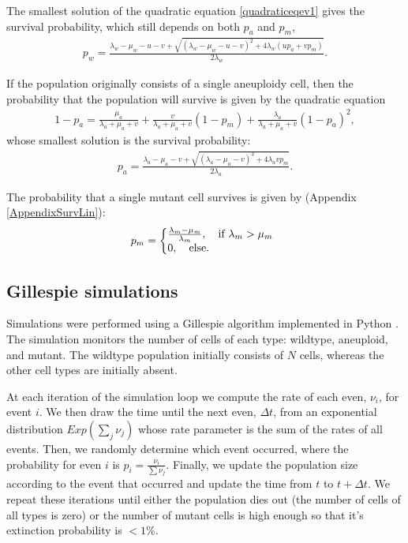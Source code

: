 \documentclass[12pt]{extarticle}
\begin{document}
The smallest solution of the quadratic equation \cref{quadraticeqev1} gives the survival probability, which still depends on both $p_a$ and $p_m$,
\begin{align}\label{survprobw}
p_w=\frac{\lambda_w-\mu_w-u-v+\sqrt{\left(\lambda_w-\mu_w-u-v\right)^2+4\lambda_w\left(up_a+vp_m\right)}}{2\lambda_w} .
\end{align}

If the population originally consists of a single aneuploidy cell, then the probability that the population will survive is given by the quadratic equation
\begin{align}
1-p_a=\frac{\mu_a}{\lambda_a+\mu_a+v}+\frac{v}{\lambda_a+\mu_a+v}\left(1-p_m\right)+\frac{\lambda_a}{\lambda_a+\mu_a+v}\left(1-p_a\right)^2,
\end{align}
whose smallest solution is the survival probability:
\begin{align}\label{survproba}
p_a=\frac{\lambda_a-\mu_a-v+\sqrt{\left(\lambda_a-\mu_a-v\right)^2+4\lambda_avp_m}}{2\lambda_a}.
\end{align}

The probability that a single mutant cell survives is given by (Appendix \ref{AppendixSurvLin}):
\begin{equation}
p_m = \left\{
  \begin{array}{@{}ll@{}}
  \frac{\lambda_m-\mu_m}{\lambda_m},\quad \text{if }\lambda_m>\mu_m \\
   0,\quad \text{else} .
  \end{array}\right.
\end{equation}

\subsection*{Gillespie simulations} 
Simulations were performed using a Gillespie algorithm \cite{gillespie1976general,gillespie1977exact} implemented in Python \cite{pyhon}.
The simulation monitors the number of cells of each type: wildtype, aneuploid, and mutant. 
The wildtype population initially consists of $N$ cells, whereas the other cell types are initially absent.

At each iteration of the simulation loop we compute the rate of each even, $\nu_i$, for event $i$. %
We then draw the time until the next even, $\Delta t$, from an exponential distribution $\textit{Exp}(\sum_j \nu_j)$ whose rate parameter is the sum of the rates of all events.
Then, we randomly determine which event occurred, where the probability for even $i$ is $p_i=\frac{\nu_i}{\sum \nu_j}$.
Finally, we update the population size according to the event that occurred and update the time from $t$ to $t+\Delta t$.
We repeat these iterations until either the population dies out (the number of cells of all types is zero) or the number of mutant cells is high enough so that it's extinction probability is $<1\%$. %
\end{document}
